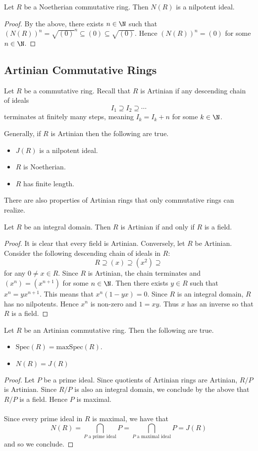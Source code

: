 \documentclass[a4paper]{article}
\begin{document}
\begin{prp}{}{} Let $R$ be a Noetherian commutative ring. Then $N(R)$ is a nilpotent ideal. \tcbline
\begin{proof}
By the above, there exists $n\in\N$ such that $(N(R))^n=\sqrt{(0)}^n\subseteq (0)\subseteq\sqrt{(0)}$. Hence $(N(R))^n=(0)$ for some $n\in\N$. 
\end{proof}
\end{prp}

\subsection{Artinian Commutative Rings}
Let $R$ be a commutative ring. Recall that $R$ is Artinian if any descending chain of ideals $$I_1\supseteq I_2\supseteq\cdots$$ terminates at finitely many steps, meaning $I_k=I_k+n$ for some $k\in\N$. 

Generally, if $R$ is Artinian then the following are true. 
\begin{itemize}
\item $J(R)$ is a nilpotent ideal. 
\item $R$ is Noetherian. 
\item $R$ has finite length. 
\end{itemize}

There are also properties of Artinian rings that only commutative rings can realize. 

\begin{prp}{}{} Let $R$ be an integral domain. Then $R$ is Artinian if and only if $R$ is a field. \tcbline
\begin{proof}
It is clear that every field is Artinian. Conversely, let $R$ be Artinian. Consider the following descending chain of ideals in $R$: $$R\supseteq(x)\supseteq(x^2)\supseteq$$ for any $0\neq x\in R$. Since $R$ is Artinian, the chain terminates and $(x^n)=(x^{n+1})$ for some $n\in\N$. Then there exists $y\in R$ such that $x^n=yx^{n+1}$. This means that $x^n(1-yx)=0$. Since $R$ is an integral domain, $R$ has no nilpotents. Hence $x^n$ is non-zero and $1=xy$. Thus $x$ has an inverse so that $R$ is a field. 
\end{proof}
\end{prp}

\begin{prp}{}{} Let $R$ be an Artinian commutative ring. Then the following are true. 
\begin{itemize}
\item $\text{Spec}(R)=\text{maxSpec}(R)$. 
\item $N(R)=J(R)$
\end{itemize}
\begin{proof}
Let $P$ be a prime ideal. Since quotients of Artinian rings are Artinian, $R/P$ is Artinian. Since $R/P$ is also an integral domain, we conclude by the above that $R/P$ is a field. Hence $P$ is maximal. \\~\\

Since every prime ideal in $R$ is maximal, we have that $$N(R)=\bigcap_{P\text{ a prime ideal}}P=\bigcap_{P\text{ a maximal ideal}}P=J(R)$$ and so we conclude. 
\end{proof}
\end{prp}
\end{document}
